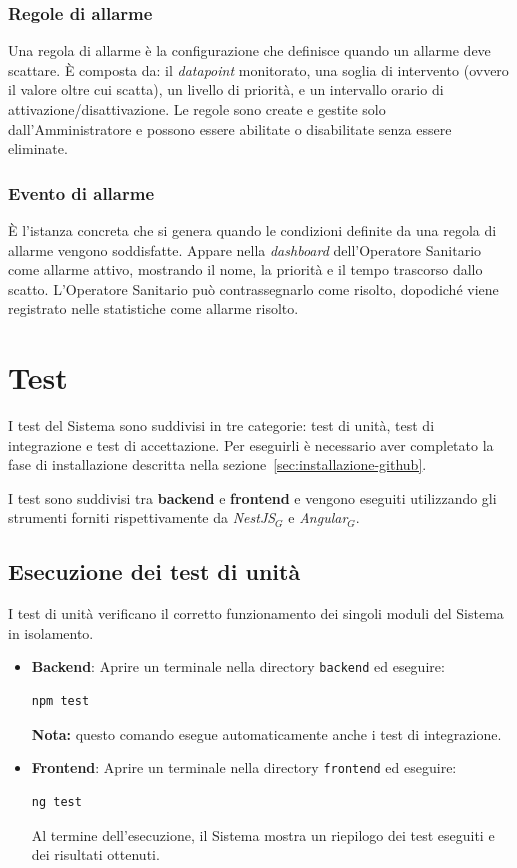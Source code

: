 \documentclass[10pt, letterpaper]{article}
\begin{document}
\subsubsection{Regole di allarme}
Una regola di allarme è la configurazione che definisce quando un 
allarme deve scattare. 
È composta da: il \textit{datapoint} monitorato, una soglia di intervento 
(ovvero il valore oltre cui scatta), un livello di priorità, 
e un intervallo orario di attivazione/disattivazione. 
Le regole sono create e gestite solo dall'Amministratore e possono essere 
abilitate o disabilitate senza essere eliminate.
\subsubsection{Evento di allarme}
È l'istanza concreta che si genera quando le condizioni definite da 
una regola di allarme vengono soddisfatte. 
Appare nella \textit{dashboard} dell'Operatore Sanitario come allarme attivo, 
mostrando il nome, la priorità e il tempo trascorso dallo scatto. 
L'Operatore Sanitario può contrassegnarlo come risolto, 
dopodiché viene registrato nelle statistiche come allarme risolto.

\section{Test}

I test del Sistema sono suddivisi in tre categorie: test di unità, test di integrazione e test di accettazione.
Per eseguirli è necessario aver completato la fase di installazione descritta nella sezione~\ref{sec:installazione-github}.

\noindent
I test sono suddivisi tra \textbf{backend} e \textbf{frontend} e vengono eseguiti utilizzando gli strumenti forniti rispettivamente da \textit{NestJS}$_G$ e \textit{Angular}$_G$.

\subsection{Esecuzione dei test di unità}

I test di unità verificano il corretto funzionamento dei singoli moduli del Sistema in isolamento.
\begin{itemize}
      \item \textbf{Backend}: Aprire un terminale nella directory \texttt{backend} ed eseguire:
      \begin{verbatim}npm test\end{verbatim}
      
      \textbf{Nota:} questo comando esegue automaticamente anche i test di integrazione.
      \item \textbf{Frontend}: Aprire un terminale nella directory \texttt{frontend} ed eseguire:
      \begin{verbatim}ng test\end{verbatim}
      Al termine dell'esecuzione, il Sistema mostra un riepilogo dei test eseguiti e dei risultati ottenuti.
\end{itemize}
\end{document}
